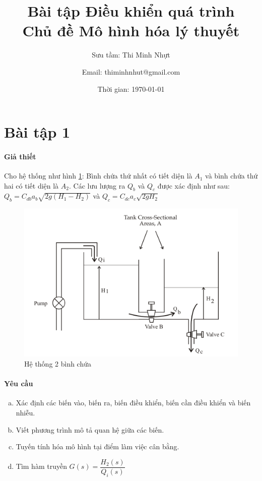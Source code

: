 \documentclass[12pt,a4paper]{article}
\title{\textbf{Bài tập Điều khiển quá trình \bigskip \\ Chủ đề Mô hình hóa lý thuyết}}
\author{Sưu tầm: Thi Minh Nhựt \and Email: thiminhnhut@gmail.com}
\date{Thời gian: \today}
\begin{document}
\maketitle

\section{Bài tập 1}
    \paragraph{Giả thiết}
        Cho hệ thống như hình \ref{baitap1}: Bình chứa thứ nhất có tiết diện là $A_1$ và bình chứa thứ hai có tiết diện là $A_2$. Các lưu lượng ra $Q_b$ và $Q_c$ được xác định như sau: $Q_b = C_{db}a_b\sqrt{2g(H_1 - H_2)}$ và $Q_c = C_{dc}a_c\sqrt{2gH_2}$
        \begin{figure}[htp]
            \begin{center}
                \includegraphics[scale=.3]{bai1}
            \end{center}
            \caption{Hệ thống 2 bình chứa} \label{baitap1}
        \end{figure}

    \paragraph{Yêu cầu}
        \begin{enumerate}[a.]
            \item Xác định các biến vào, biến ra, biến điều khiển, biến cần điều khiển và biến nhiễu.
            \item Viết phương trình mô tả quan hệ giữa các biến.
            \item Tuyến tính hóa mô hình tại điểm làm việc cân bằng.
            \item Tìm hàm truyền $G(s) = \dfrac{H_2(s)}{Q_i(s)}$
        \end{enumerate}
\end{document}

